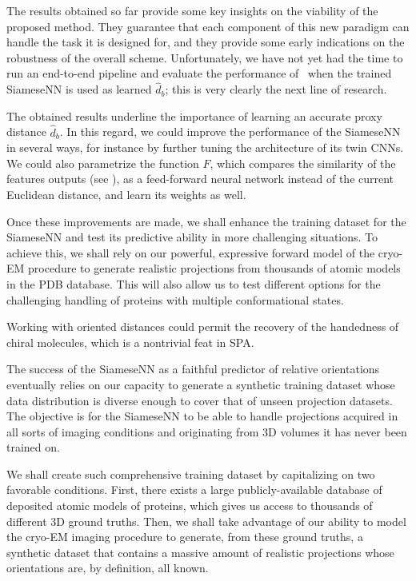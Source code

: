 
The results obtained so far provide some key insights on the viability of the proposed method.
They guarantee that each component of this new paradigm can handle the task it is designed for, and they provide some early indications on the robustness of the overall scheme.
Unfortunately, we have not yet had the time to run an end-to-end pipeline and evaluate the performance of~ when the trained SiameseNN is used as learned $\widehat{d}_b$; this is very clearly the next line of research.

The obtained results underline the importance of learning an accurate proxy distance $\widehat{d}_b$.
In this regard, we could improve the performance of the SiameseNN in several ways, for instance by further tuning the architecture of its twin CNNs.
We could also parametrize the function $F$, which compares the similarity of the features outputs (see ), as a feed-forward neural network instead of the current Euclidean distance, and learn its weights as well.

Once these improvements are made, we shall enhance the training dataset for the SiameseNN and test its predictive ability in more challenging situations.
To achieve this, we shall rely on our powerful, expressive forward model of the cryo-EM procedure to generate realistic projections from thousands of atomic models in the PDB database.
This will also allow us to test different options for the challenging handling of proteins with multiple conformational states.

Working with oriented distances could permit the recovery of the handedness of chiral molecules, which is a nontrivial feat in SPA.



The success of the SiameseNN as a faithful predictor of relative orientations eventually relies on our capacity to generate a synthetic training dataset whose data distribution is diverse enough to cover that of unseen projection datasets.
The objective is for the SiameseNN to be able to handle projections acquired in all sorts of imaging conditions and originating from 3D volumes it has never been trained on.

We shall create such comprehensive training dataset by capitalizing on two favorable conditions.
First, there exists a large publicly-available database of deposited atomic models of proteins, which gives us access to thousands of different 3D ground truths.
Then, we shall take advantage of our ability to model the cryo-EM imaging procedure to generate, from these ground truths, a synthetic dataset that contains a massive amount of realistic projections whose orientations are, by definition, all known.

